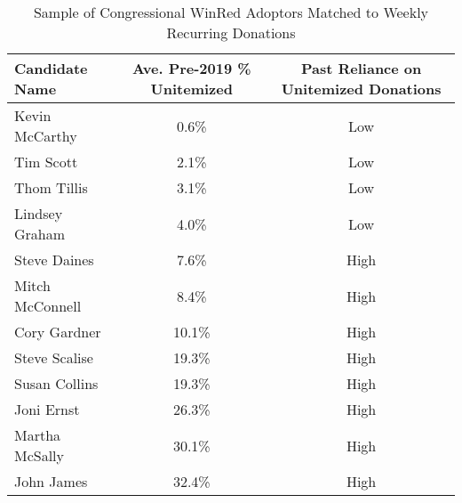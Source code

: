 \begin{table}[ht]
\centering
\begin{tabular}{lcc}
  \toprule
Candidate Name & Ave. Pre-2019 \% Unitemized & Past Reliance on Unitemized Donations \\ 
  \midrule
Kevin McCarthy & 0.6\% & Low \\ 
  Tim Scott & 2.1\% & Low \\ 
  Thom Tillis & 3.1\% & Low \\ 
  Lindsey Graham & 4.0\% & Low \\ 
  Steve Daines & 7.6\% & High \\ 
  Mitch McConnell & 8.4\% & High \\ 
  Cory Gardner & 10.1\% & High \\ 
  Steve Scalise & 19.3\% & High \\ 
  Susan Collins & 19.3\% & High \\ 
  Joni Ernst & 26.3\% & High \\ 
  Martha McSally & 30.1\% & High \\ 
  John James & 32.4\% & High \\ 
   \bottomrule
\end{tabular}
\caption{Sample of Congressional WinRed Adoptors Matched to Weekly Recurring Donations} 
\label{tab:pnas-sample}
\end{table}
